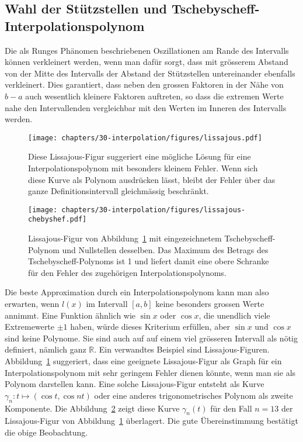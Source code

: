 %
%
\subsection{Wahl der Stützstellen und Tschebyscheff-Interpolationspolynom
\label{buch:section:interpolation:tschebyscheff}}
Die als Runges Phänomen beschriebenen Oszillationen am Rande des Intervalls
können verkleinert werden, wenn man dafür sorgt, dass
mit grösserem Abstand von der Mitte des Intervalls der Abstand der
Stützstellen untereinander ebenfalls verkleinert.
%
%
Dies garantiert, dass neben den grossen Faktoren in der Nähe von $b-a$ 
auch wesentlich kleinere Faktoren auftreten, so dass die extremen Werte
nahe den Intervallenden vergleichbar mit den Werten im Inneren des
Intervalls werden.

\begin{figure}
\centering
\texttt{[image: chapters/30-interpolation/figures/lissajous.pdf]}
\caption{Diese Lissajous-Figur suggeriert eine mögliche Lösung für eine 
Interpolationspolynom mit besonders kleinem Fehler.
%
Wenn sich diese Kurve als Polynom ausdrücken lässt, bleibt der Fehler über
das ganze Definitionsintervall gleichmässig beschränkt.
\label{buch:figure:lissajous}}
\end{figure}

\begin{figure}
\centering
\texttt{[image: chapters/30-interpolation/figures/lissajous-chebyshef.pdf]}
\caption{Lissajous-Figur von Abbildung~\ref{buch:figure:lissajous}
mit eingezeichnetem Tschebyscheff-Polynom und Nullstellen
desselben.
%
%
Das Maximum des Betrags des Tschebyscheff-Polynoms ist 1 und liefert 
damit eine obere Schranke für den Fehler des zugehörigen
Interpolationspolynoms.
%
\label{buch:figure:lissajous-chebyshef}}
\end{figure}

Die beste Approximation durch ein Interpolationspolynom kann man also
erwarten, wenn $l(x)$ im Intervall $[a,b]$ keine besonders grossen Werte
annimmt.
%
Eine Funktion ähnlich wie $\sin x$ oder $\cos x$, die unendlich viele
Extremewerte $\pm 1$ haben, würde dieses Kriterium erfüllen, aber
$\sin x$ und $\cos x$ sind keine Polynome.
Sie sind auch auf auf einem viel grösseren Intervall als nötig definiert,
nämlich ganz $\mathbb R$.
Ein verwandtes Beispiel sind Lissajous-Figuren.
%
Abbildung~\ref{buch:figure:lissajous} suggeriert, dass eine geeignete
Lissajous-Figur als Graph für ein Interpolationspolynom mit sehr
geringem Fehler dienen könnte, wenn man sie als Polynom darstellen kann.
Eine solche Lissajous-Figur entsteht als Kurve
$\gamma_n\colon t\mapsto (\cos t, \cos nt)$ oder eine anderes trigonometrisches
Polynom als zweite Komponente.
%
%
Die Abbildung~\ref{buch:figure:lissajous-chebyshef} zeigt diese Kurve
$\gamma_n(t)$
für den Fall $n=13$ der Lissajous-Figur von
Abbildung~\ref{buch:figure:lissajous} überlagert.
Die gute Übereinstimmung bestätigt die obige Beobachtung.

